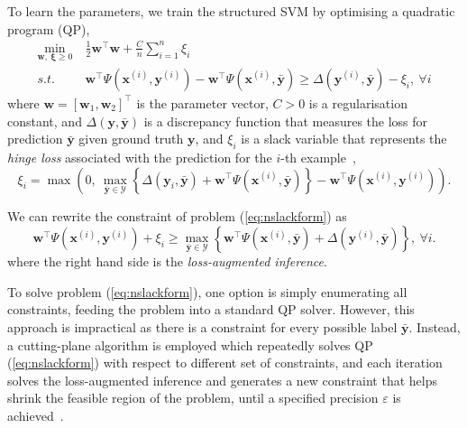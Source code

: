 \documentclass[twocolumn,9pt]{extarticle}
\begin{document}
To learn the parameters, we train the structured SVM by optimising a quadratic program (QP),
\begin{equation}
\label{eq:nslackform}
\begin{aligned}
\min_{\mathbf{w}, ~\bm{\xi} \ge 0} ~& \frac{1}{2} \mathbf{w}^\top \mathbf{w} + \frac{C}{n} \sum_{i=1}^n \xi_i \\
s.t.~~ ~& \mathbf{w}^\top \Psi(\mathbf{x}^{(i)}, \mathbf{y}^{(i)}) - \mathbf{w}^\top \Psi(\mathbf{x}^{(i)}, \bar{\mathbf{y}}) \ge 
       \Delta(\mathbf{y}^{(i)}, \bar{\mathbf{y}}) - \xi_i, ~\forall i
\end{aligned}
\end{equation}
where $\mathbf{w} = [\mathbf{w}_1, \mathbf{w}_2]^\top$ is the parameter vector, $C > 0$ is a regularisation constant, 
and $\Delta(\mathbf{y}, \bar{\mathbf{y}})$ is a discrepancy function that measures the loss 
for prediction $\bar{\mathbf{y}}$ given ground truth $\mathbf{y}$, and $\xi_i$
is a slack variable that represents the \emph{hinge loss} associated with the prediction for the $i$-th example~\cite{tsochantaridis2005large},
\begin{equation*}
\label{eq:nslackloss}
\xi_i = \max \left( 0,~ 
        \max_{\bar{\mathbf{y}} \in \mathcal{Y}} 
        \left\{ \Delta(\mathbf{y}_i, \bar{\mathbf{y}}) + \mathbf{w}^\top \Psi(\mathbf{x}^{(i)}, \bar{\mathbf{y}}) \right\} -
        \mathbf{w}^\top \Psi(\mathbf{x}^{(i)}, \mathbf{y}^{(i)}) \right).
\end{equation*}

We can rewrite the constraint of problem (\ref{eq:nslackform}) as
\begin{equation*}
\mathbf{w}^\top \Psi(\mathbf{x}^{(i)}, \mathbf{y}^{(i)}) + \xi_i \ge
          \max_{\bar{\mathbf{y}} \in \mathcal{Y}} 
          \left\{\mathbf{w}^\top \Psi(\mathbf{x}^{(i)}, \bar{\mathbf{y}}) + \Delta(\mathbf{y}^{(i)}, \bar{\mathbf{y}}) \right\},~ \forall i.
\end{equation*}
where the right hand side is the \emph{loss-augmented inference}.

To solve problem (\ref{eq:nslackform}), one option is simply enumerating all constraints, feeding the problem into a standard QP solver.
However, this approach is impractical as there is a constraint for every possible label $\bar{\mathbf{y}}$.
Instead, a cutting-plane algorithm is employed which repeatedly solves QP (\ref{eq:nslackform}) with respect to different set of constraints, 
and each iteration solves the loss-augmented inference and generates a new constraint that helps shrink the feasible region of the problem, 
until a specified precision $\varepsilon$ is achieved~\cite{joachims2009predicting}.
\end{document}
